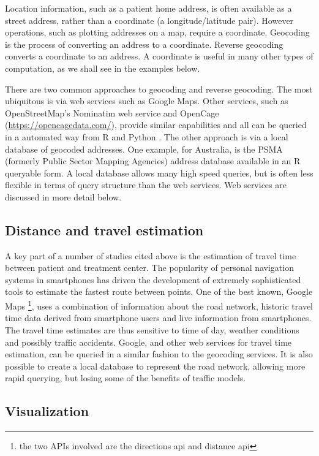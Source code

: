 \documentclass[utf8]{frontiersHLTH}
\begin{document}
Location information, such as a patient home address, is often available
as a street address, rather than a coordinate (a longitude/latitude
pair). However operations, such as plotting addresses on a map, require
a coordinate. Geocoding is the process of converting an address to a
coordinate. Reverse geocoding converts a coordinate to an address. A
coordinate is useful in many other types of computation, as we shall see
in the examples below.

There are two common approaches to geocoding and reverse geocoding. The
most ubiquitous is via web services such as Google Maps. Other services,
such as OpenStreetMap's Nominatim web service and OpenCage
(\url{https://opencagedata.com/}), provide similar capabilities and all
can be queried in a automated way from R and Python \cite{opencage}. The
other approach is via a local database of geocoded addresses. One
example, for Australia, is the PSMA (formerly Public Sector Mapping
Agencies) address database available in an R queryable form. A local
database allows many high speed queries, but is often less flexible in
terms of query structure than the web services. Web services are
discussed in more detail below.

\subsection{Distance and travel estimation}\label{distance-and-travel-estimation}

A key part of a number of studies cited above is the estimation of
travel time between patient and treatment center. The popularity of
personal navigation systems in smartphones has driven the development of
extremely sophisticated tools to estimate the fastest route between
points. One of the best known, Google Maps \footnote{the two APIs
involved are the directions api and distance api}, uses a combination
of information about the road network, historic travel time data derived
from smartphone users and live information from smartphones. The travel
time estimates are thus sensitive to time of day, weather conditions and
possibly traffic accidents. Google, and other web services for travel
time estimation, can be queried in a similar fashion to the geocoding
services. It is also possible to create a local database to represent
the road network, allowing more rapid querying, but losing some of the
benefits of traffic models.

\subsection{Visualization}\label{visualization}
\end{document}
